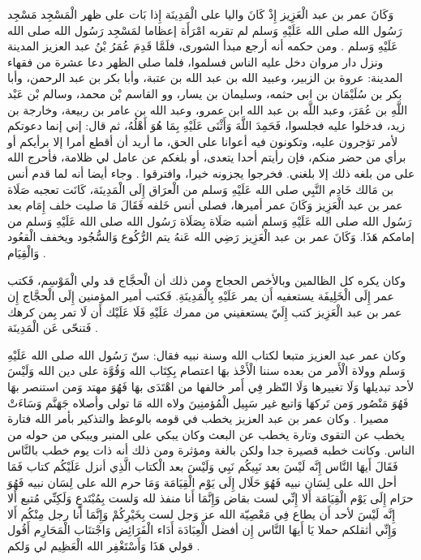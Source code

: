 وَكَانَ عمر بن عبد الْعَزِيز إِذْ كَانَ واليا على الْمَدِينَة إِذا بَات على ظهر الْمَسْجِد مَسْجِد رَسُول الله صلى الله عَلَيْهِ وَسلم لم تقربه امْرَأَة إعظاما لمَسْجِد رَسُول الله صلى الله عَلَيْهِ وَسلم \cite{ibnAbdAlHakam_OmarIbnAbdAlAziz}.
ومن حكمه أنه أرجع مبدأ الشورى، فلَمَّا قَدِمَ عُمَرُ بْنُ عبد العزيز المدينة ونزل دار مروان دخل عليه الناس فسلموا، فلما صلى الظهر دعا عشرة من فقهاء المدينة: عروة بن الزبير، وعبيد الله بن عبد الله بن عتبة، وأبا بكر بن عبد الرحمن، وأبا بكر بن سُلَيْمَان بن ابى حثمه، وسليمان بن يسار، وو القاسم بْن محمد، وسالم بْن عَبْد اللَّهِ بن عُمَرَ، وعبد اللَّه بن عبد الله ابن عمرو، وعبد الله بن عامر بن ربيعة، وخارجة بن زيد، فدخلوا عليه فجلسوا، فَحَمِدَ اللَّهَ وَأَثْنَى عَلَيْهِ بِمَا هُوَ أَهْلُهُ، ثم قال: إني إنما دعوتكم لأمر تؤجرون عليه، وتكونون فيه أعوانا على الحق، ما أريد أن أقطع أمرا إلا برأيكم أو برأي من حضر منكم، فإن رأيتم أحدا يتعدى، أو بلغكم عن عامل لي ظلامة، فأحرج الله على من بلغه ذلك إلا بلغني. فخرجوا يجزونه خيرا، وافترقوا \cite{ibnJareerTabari_Tareekh}. وجاء أيضا أنه لما قدم أنس بن مَالك خَادِم النَّبِي صلى الله عَلَيْهِ وَسلم من الْعرَاق إِلَى الْمَدِينَة، كَانَت تعجبه صَلَاة عمر بن عبد الْعَزِيز وَكَانَ عمر أميرها، فصلى أنس خَلفه فَقَالَ مَا صليت خلف إِمَام بعد رَسُول الله صلى الله عَلَيْهِ وَسلم أشبه صَلَاة بِصَلَاة رَسُول الله صلى الله عَلَيْهِ وَسلم من إمامكم هَذَا. وَكَانَ عمر بن عبد الْعَزِيز رَضِي الله عَنهُ يتم الرُّكُوع وَالسُّجُود ويخفف الْقعُود وَالْقِيَام \cite{ibnJareerTabari_Tareekh}.

وكان يكره كل الظالمين وبالأخص الحجاج ومن ذلك أن الْحجَّاج قد ولي الْمَوْسِم، فَكتب عمر إِلَى الْخَلِيفَة يستعفيه أَن يمر عَلَيْهِ بِالْمَدِينَةِ. فَكتب أمير المؤمنين إِلَى الْحجَّاج إِن عمر بن عبد الْعَزِيز كتب إِلَيّ يستعفيني من ممرك عَلَيْهِ فَلَا عَلَيْك أَن لَا تمر بِمن كرهك فَتنحّى عَن الْمَدِينَة  \cite{ibnAbdAlHakam_OmarIbnAbdAlAziz}.

وكان عمر عبد العزيز متبعا لكتاب الله وسنة نبيه فقال: سنّ رَسُول الله صلى الله عَلَيْهِ وَسلم وولاة الْأَمر من بعده سننا الْأَخْذ بهَا اعتصام بِكِتَاب الله وَقُوَّة على دين الله وَلَيْسَ لأحد تبديلها وَلَا تغييرها وَلَا النّظر فِي أَمر خالفها من اهْتَدَى بهَا فَهُوَ مهتد وَمن استنصر بهَا فَهُوَ مَنْصُور وَمن تَركهَا وَاتبع غير سَبِيل الْمُؤمنِينَ ولاه الله مَا تولى وأصلاه جَهَنَّم وَسَاءَتْ مصيرا \cite{ibnAbdAlHakam_OmarIbnAbdAlAziz}.  وكان عمر بن عبد العزيز يخطب في قومه بالوعظ والتذكير بأمر الله فتارة يخطب عن التقوى وتارة يخطب عن البعث وكان يبكي على المنبر ويبكي من حوله من الناس. وكانت خطبه قصيرة جدا ولكن بالغة ومؤثرة ومن ذلك أنه ذات يوم خطب بالنَّاس فَقَالَ أَيهَا النَّاس إِنَّه لَيْسَ بعد نَبِيكُم نَبِي وَلَيْسَ بعد الْكتاب الَّذِي أنزل عَلَيْكُم كتاب فَمَا أحل الله على لِسَان نبيه فَهُوَ حَلَال إِلَى يَوْم الْقِيَامَة وَمَا حرم الله على لِسَان نبيه فَهُوَ حرَام إِلَى يَوْم الْقِيَامَة أَلا إِنِّي لست بقاض وَإِنَّمَا أَنا منفذ لله وَلست بِمُبْتَدعٍ وَلَكِنِّي مُتبع أَلا إِنَّه لَيْسَ لأحد أَن يطاع فِي مَعْصِيّة الله عز وَجل لست بِخَيْرِكُمْ وَإِنَّمَا أَنا رجل مِنْكُم أَلا وَإِنِّي أثقلكم حملا يَا أَيهَا النَّاس إِن أفضل الْعِبَادَة أَدَاء الْفَرَائِض وَاجْتنَاب الْمَحَارِم أَقُول قولي هَذَا وَأَسْتَغْفِر الله الْعَظِيم لي وَلكم \cite{ibnAbdAlHakam_OmarIbnAbdAlAziz}.

